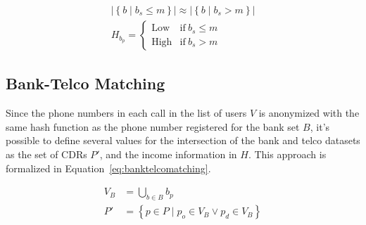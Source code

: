 \begin{equation}
\label{eq:lowhighincome}
\begin{gathered}
	\left| \left\{ b \mid b_s \leq m \right\} \right| \approx \left| \left\{ b \mid b_s > m \right\} \right| \\
	H_{b_p} = \begin{cases} \text{Low} & \text{if} \ b_s \leq m \\ \text{High} & \text{if} \ b_s > m \end{cases}
\end{gathered}
\end{equation}

\subsection{Bank-Telco Matching}

Since the phone numbers in each call in the list of users $V$ is anonymized with the same hash function as the phone number registered for the bank set $B$, it's possible to define several values for the intersection of the bank and telco datasets as the set of CDRs $P'$, and the income information in $H$. This approach is formalized in Equation~\ref{eq:banktelcomatching}.

\begin{equation}
\label{eq:banktelcomatching}
\begin{aligned}
	V_B &= \bigcup_{b \in B} b_p \\
	P' &= \left\{ p \in P \mid p_o \in V_B \lor p_d \in V_B \right\}
\end{aligned}
\end{equation}
